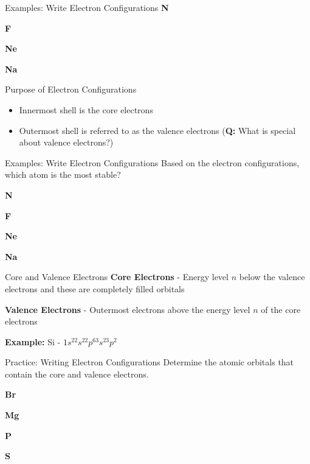 \documentclass[11pt]{beamer}
\begin{document}
\begin{frame}{Examples: Write Electron Configurations}
  \textbf{N}
  \vspace{0.25in}
  
  \textbf{F}
  \vspace{0.25in}
  
  \textbf{Ne}
  \vspace{0.25in}

  \textbf{Na}
\end{frame}

\begin{frame}{Purpose of Electron Configurations}
  \begin{itemize}
  \item Innermost shell is the core electrons
  \item Outermost shell is referred to as the valence
    electrons (\textbf{Q:} What is special about valence electrons?)
  \end{itemize}
\end{frame}

\begin{frame}{Examples: Write Electron Configurations}
  Based on the electron configurations, which atom is the most stable?
  
  \textbf{N}
  \vspace{0.25in}
  
  \textbf{F}
  \vspace{0.25in}
  
  \textbf{Ne}
  \vspace{0.25in}

  \textbf{Na}
\end{frame}

\begin{frame}{Core and Valence Electrons}
  \textbf{Core Electrons} - Energy level $n$ below the valence
  electrons and these are completely filled orbitals

  \textbf{Valence Electrons} - Outermost electrons above the energy
  level $n$ of the core electrons

  \textbf{Example:} Si - $1s^22s^22p^63s^23p^2$
\end{frame}

\begin{frame}{Practice: Writing Electron Configurations}
  Determine the atomic orbitals that contain the core and valence electrons.
  
  \textbf{Br}
  \vspace{0.25in}
  
  \textbf{Mg}
  \vspace{0.25in}
  
  \textbf{P}
  \vspace{0.25in}

  \textbf{S}
\end{frame}
\end{document}
